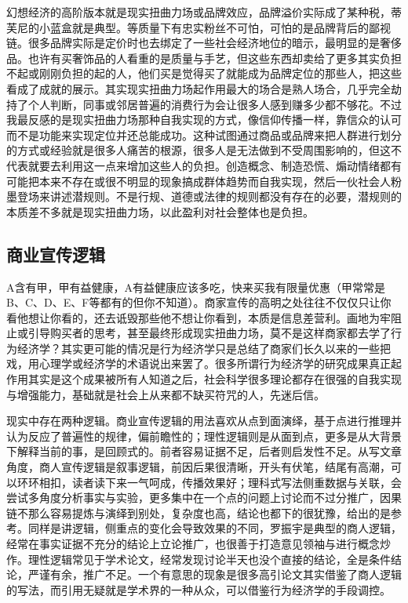 \documentclass[
  letterpaper,
  DIV=11,
  numbers=noendperiod]{scrreprt}
\begin{document}
幻想经济的高阶版本就是现实扭曲力场或品牌效应，品牌溢价实际成了某种税，蒂芙尼的小蓝盒就是典型。等质量下有忠实粉丝不可怕，可怕的是品牌背后的鄙视链。很多品牌实际是定价时也去绑定了一些社会经济地位的暗示，最明显的是奢侈品。也许有买奢饰品的人看重的是质量与手艺，但这些东西却卖给了更多其实负担不起或刚刚负担的起的人，他们买是觉得买了就能成为品牌定位的那些人，把这些看成了成就的展示。其实现实扭曲力场起作用最大的场合是熟人场合，几乎完全劫持了个人判断，同事或邻居普遍的消费行为会让很多人感到赚多少都不够花。不过我最反感的是现实扭曲力场那种自我实现的方式，像信仰传播一样，靠信众的认可而不是功能来实现定位并还总能成功。这种试图通过商品或品牌来把人群进行划分的方式或经验就是很多人痛苦的根源，很多人是无法做到不受周围影响的，但这不代表就要去利用这一点来增加这些人的负担。创造概念、制造恐慌、煽动情绪都有可能把本来不存在或很不明显的现象搞成群体趋势而自我实现，然后一伙社会人粉墨登场来讲述潜规则。不是行规、道德或法律的规则都没有存在的必要，潜规则的本质差不多就是现实扭曲力场，以此盈利对社会整体也是负担。

\subsection{商业宣传逻辑}\label{ux5546ux4e1aux5ba3ux4f20ux903bux8f91}

A含有甲，甲有益健康，A有益健康应该多吃，快来买我有限量优惠（甲常常是B、C、D、E、F等都有的但你不知道）。商家宣传的高明之处往往不仅仅只让你看他想让你看的，还去诋毁那些他不想让你看到，本质是信息差营利。画地为牢阻止或引导购买者的思考，甚至最终形成现实扭曲力场，莫不是这样商家都去学了行为经济学？其实更可能的情况是行为经济学只是总结了商家们长久以来的一些把戏，用心理学或经济学的术语说出来罢了。很多所谓行为经济学的研究成果真正起作用其实是这个成果被所有人知道之后，社会科学很多理论都存在很强的自我实现与增强能力，基础就是社会上从来都不缺买符咒的人，先迷后信。

现实中存在两种逻辑。商业宣传逻辑的用法喜欢从点到面演绎，基于点进行推理并认为反应了普遍性的规律，偏前瞻性的；理性逻辑则是从面到点，更多是从大背景下解释当前的事，是回顾式的。前者容易证据不足，后者则启发性不足。从写文章角度，商人宣传逻辑是叙事逻辑，前因后果很清晰，开头有伏笔，结尾有高潮，可以环环相扣，读者读下来一气呵成，传播效果好；理科式写法侧重数据与关联，会尝试多角度分析事实与实验，更多集中在一个点的问题上讨论而不过分推广，因果链不那么容易提炼与演绎到别处，复杂度也高，结论也都下的很犹豫，给出的是参考。同样是讲逻辑，侧重点的变化会导致效果的不同，罗振宇是典型的商人逻辑，经常在事实证据不充分的结论上立论推广，也很善于打造意见领袖与进行概念炒作。理性逻辑常见于学术论文，经常发现讨论半天也没个直接的结论，全是条件结论，严谨有余，推广不足。一个有意思的现象是很多高引论文其实借鉴了商人逻辑的写法，而引用无疑就是学术界的一种从众，可以借鉴行为经济学的手段调控。
\end{document}
